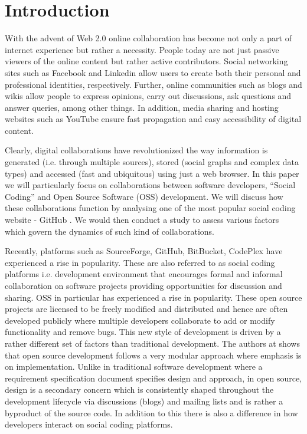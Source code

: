 
\section{Introduction}
\label{sec:introduction}

With the advent of Web 2.0 online collaboration has become not only a part of internet experience but rather a necessity. People today are not just passive viewers of the online content but rather active contributors. Social networking sites such as Facebook and Linkedin allow users to create both their personal and professional identities, respectively. Further, online communities such as blogs and wikis allow people to express opinions, carry out discussions, ask questions and answer queries, among other things. In addition, media sharing and hosting websites such as YouTube ensure fast propagation and easy accessibility of digital content.

Clearly, digital collaborations have revolutionized the way information is generated (i.e. through multiple sources), stored (social graphs and complex data types) and accessed (fast and ubiquitous) using just a web browser. In this paper we will particularly focus on collaborations between software developers, ``Social Coding'' and Open Source Software (OSS) development. We will discuss how these collaborations function by analysing one of the most popular social coding website - GitHub \cite{GitHub}. We would then conduct a study to assess various factors which govern the dynamics of such kind of collaborations.

Recently, platforms such as SourceForge, GitHub, BitBucket, CodePlex have experienced a rise in popularity. These are also referred to as social coding platforms i.e. development environment that encourages formal and informal collaboration on software projects providing opportunities for discussion and sharing. OSS in particular has experienced a rise in popularity. These open source projects are licensed to be freely modified and distributed and hence are often developed publicly where multiple developers collaborate to add or modify functionality and remove bugs. This new style of development is driven by a rather different set of factors than traditional development. The authors at \cite{LlanosC12} shows that open source development follows a very modular approach where emphasis is on implementation. Unlike in traditional software development where a requirement specification document specifies design and approach, in open source, design is a secondary concern which is consistently shaped throughout the development lifecycle via discussions (blogs) and mailing lists and is rather a byproduct of the source code. In addition to this there is also a difference in how developers interact on social coding platforms.


